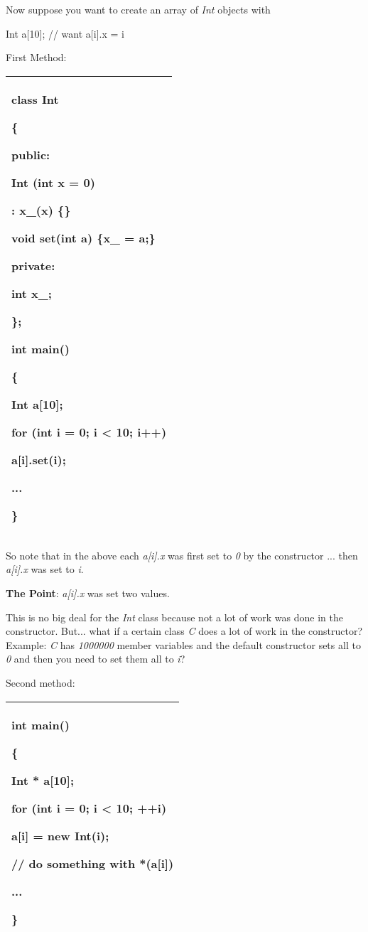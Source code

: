 \documentclass[
]{article}
\begin{document}
Now suppose you want to create an array of \emph{Int} objects with

Int a{[}10{]}; // want a{[}i{]}.x = i

First Method:

\begin{longtable}[]{@{}l@{}}
\toprule
\endhead
\begin{minipage}[t]{0.97\columnwidth}\raggedright
class Int

\{

public:

Int (int x = 0)

: x\_(x) \{\}

void set(int a) \{x\_ = a;\}

private:

int x\_;

\};

int main()

\{

Int a{[}10{]};

for (int i = 0; i \textless{} 10; i++)

a{[}i{]}.set(i);

...

\}\strut
\end{minipage}\tabularnewline
\bottomrule
\end{longtable}

So note that in the above each \emph{a{[}i{]}.x} was first set to
\emph{0} by the constructor ... then \emph{a{[}i{]}.x} was set to
\emph{i}.

\textbf{The Point}: \emph{a{[}i{]}.x} was set two values.

This is no big deal for the \emph{Int} class because not a lot of work
was done in the constructor. But... what if a certain class \emph{C}
does a lot of work in the constructor? Example: \emph{C} has
\emph{1000000} member variables and the default constructor sets all to
\emph{0} and then you need to set them all to \emph{i}?

Second method:

\begin{longtable}[]{@{}l@{}}
\toprule
\endhead
\begin{minipage}[t]{0.97\columnwidth}\raggedright
int main()

\{

Int * a{[}10{]};

for (int i = 0; i \textless{} 10; ++i)

a{[}i{]} = new Int(i);

// do something with *(a{[}i{]})

...

\}\strut
\end{minipage}\tabularnewline
\bottomrule
\end{longtable}
\end{document}
